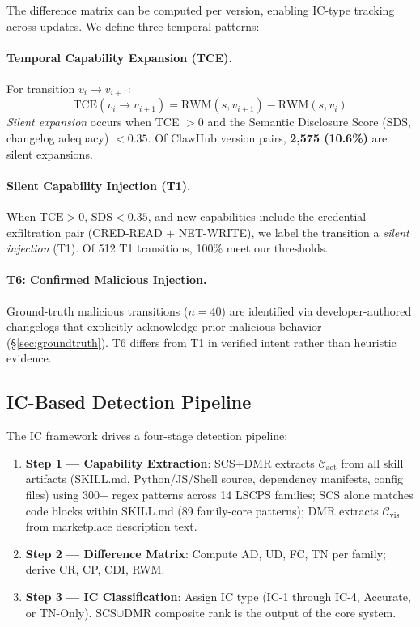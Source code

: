 The difference matrix can be computed per version,
enabling IC-type tracking across updates.
We define three temporal patterns:

\paragraph{Temporal Capability Expansion (TCE).}
For transition $v_i \to v_{i+1}$:
\begin{equation}
  \text{TCE}(v_i \to v_{i+1}) = \text{RWM}(s, v_{i+1}) - \text{RWM}(s, v_i)
  \label{eq:tce}
\end{equation}
\emph{Silent expansion} occurs when TCE $> 0$ and the Semantic Disclosure Score
(SDS, changelog adequacy) $<0.35$.
Of \Ntransitions{} ClawHub version pairs,
\textbf{2,575 (10.6\%)} are silent expansions.

\paragraph{Silent Capability Injection (T1).}
When $\text{TCE} > 0$, $\text{SDS} < 0.35$, and new capabilities
include the credential-exfiltration pair
(CRED-READ $+$ NET-WRITE), we label the
transition a \emph{silent injection} (T1).
Of 512 T1 transitions, 100\% meet our thresholds.

\paragraph{T6: Confirmed Malicious Injection.}
Ground-truth malicious transitions ($n{=}40$) are identified via
developer-authored changelogs that explicitly acknowledge prior
malicious behavior (\S\ref{sec:groundtruth}).
T6 differs from T1 in verified intent rather than heuristic evidence.

\subsection{IC-Based Detection Pipeline}
\label{sec:pipeline}

The IC framework drives a four-stage detection pipeline:

\begin{enumerate}[topsep=3pt,itemsep=2pt]
\item \textbf{Step 1 --- Capability Extraction}:
  SCS+DMR extracts $\mathcal{C}_{\text{act}}$ from all skill artifacts
  (SKILL.md, Python/JS/Shell source, dependency manifests, config files)
  using 300+ regex patterns across 14 LSCPS families; SCS alone
  matches code blocks within SKILL.md (89 family-core patterns);
  DMR extracts $\mathcal{C}_{\text{vis}}$ from marketplace description text.

\item \textbf{Step 2 --- Difference Matrix}:
  Compute AD, UD, FC, TN per family;
  derive CR, CP, CDI, RWM.

\item \textbf{Step 3 --- IC Classification}:
  Assign IC type (IC-1 through IC-4, Accurate, or TN-Only).
  SCS$\cup$DMR composite rank is the output of the core system.

\end{enumerate}

